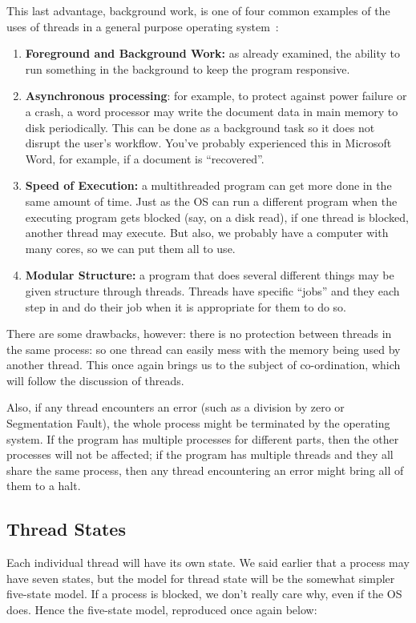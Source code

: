 This last advantage, background work, is one of four common examples of the uses of threads in a general purpose operating system~\cite{insideOS2}:
\begin{enumerate}
	\item \textbf{Foreground and Background Work:} as already examined, the ability to run something in the background to keep the program responsive.
	\item \textbf{Asynchronous processing}: for example, to protect against power failure or a crash, a word processor may write the document data in main memory to disk periodically. This can be done as a background task so it does not disrupt the user's workflow. You've probably experienced this in Microsoft Word, for example, if a document is ``recovered''.
	\item \textbf{Speed of Execution:} a multithreaded program can get more done in the same amount of time. Just as the OS can run a different program when the executing program gets blocked (say, on a disk read), if one thread is blocked, another thread may execute. But also, we probably have a computer with many cores, so we can put them all to use.
	\item \textbf{Modular Structure:} a program that does several different things may be given structure through threads. Threads have specific ``jobs'' and they each step in and do their job when it is appropriate for them to do so.
\end{enumerate}

There are some drawbacks, however: there is no protection between threads in the same process: so one thread can easily mess with the memory being used by another thread. This once again brings us to the subject of co-ordination, which will follow the discussion of threads.

Also, if any thread encounters an error (such as a division by zero or Segmentation Fault), the whole process might be terminated by the operating system. If the program has multiple processes for different parts, then the other processes will not be affected; if the program has multiple threads and they all share the same process, then any thread encountering an error might bring all of them to a halt.


\subsection*{Thread States}
Each individual thread will have its own state. We said earlier that a process may have seven states, but the model for thread state will be the somewhat simpler five-state model. If a process is blocked, we don't really care why, even if the OS does. Hence the five-state model, reproduced once again below:

